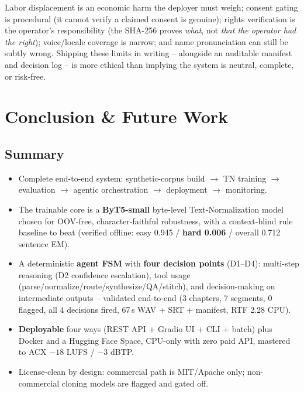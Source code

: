 \documentclass[12pt,a4paper]{article}
\begin{document}
Labor displacement is an economic harm the deployer must weigh; consent gating is procedural (it cannot verify a claimed consent is genuine); rights verification is the operator's responsibility (the SHA-256 proves \emph{what}, not \emph{that the operator had the right}); voice/locale coverage is narrow; and name pronunciation can still be subtly wrong. Shipping these limits in writing -- alongside an auditable manifest and decision log -- is more ethical than implying the system is neutral, complete, or risk-free.

\section{Conclusion \& Future Work}

\subsection{Summary}

\begin{itemize}\setlength\itemsep{0.15em}
  \item Complete end-to-end system: synthetic-corpus build $\rightarrow$ TN training $\rightarrow$ evaluation $\rightarrow$ agentic orchestration $\rightarrow$ deployment $\rightarrow$ monitoring.
  \item The trainable core is a \textbf{ByT5-small} byte-level Text-Normalization model chosen for OOV-free, character-faithful robustness, with a context-blind rule baseline to beat (verified offline: easy 0.945 / \textbf{hard 0.006} / overall 0.712 sentence EM).
  \item A deterministic \textbf{agent FSM} with \textbf{four decision points} (D1--D4): multi-step reasoning (D2 confidence escalation), tool usage (parse/normalize/route/synthesize/QA/stitch), and decision-making on intermediate outputs -- validated end-to-end (3 chapters, 7 segments, 0 flagged, all 4 decisions fired, 67\,s WAV + SRT + manifest, RTF 2.28 CPU).
  \item \textbf{Deployable} four ways (REST API + Gradio UI + CLI + batch) plus Docker and a Hugging Face Space, CPU-only with zero paid API, mastered to ACX $-18$ LUFS / $-3$ dBTP.
  \item License-clean by design: commercial path is MIT/Apache only; non-commercial cloning models are flagged and gated off.
\end{itemize}
\end{document}
